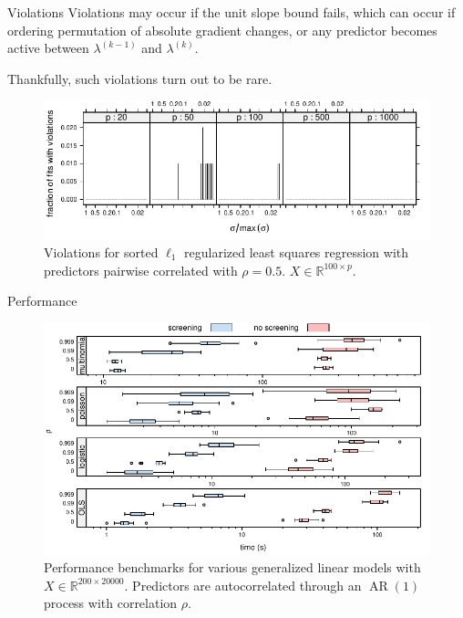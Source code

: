 \documentclass[10pt,ignorenonframetext]{beamer}
\begin{document}
\begin{frame}{Violations}
Violations may occur if the unit slope bound fails, which can occur if
ordering permutation of absolute gradient changes, or any predictor becomes active between
\(\lambda^{(k-1)}\) and \(\lambda^{(k)}\).\medskip

Thankfully, such violations turn out to be \alert{rare}.
\begin{figure}
\centering
\includegraphics[width=\linewidth]{figures/violations.pdf}
\caption{Violations for sorted \(\ell_1\) regularized least squares regression
with predictors pairwise correlated with \(\rho = 0.5\). \(X\in \mathbb{R}^{100 \times p}\).}
\end{figure}
\end{frame}

\begin{frame}{Performance}
\begin{figure}
\centering
\includegraphics[width=\linewidth]{figures/performance.pdf}
\caption{Performance benchmarks for various generalized linear models
with \(X \in \mathbb{R}^{200 \times 20000}\). Predictors are autocorrelated through an
\(\operatorname{AR}(1)\) process with correlation \(\rho\).}
\end{figure}
\end{frame}
\end{document}

